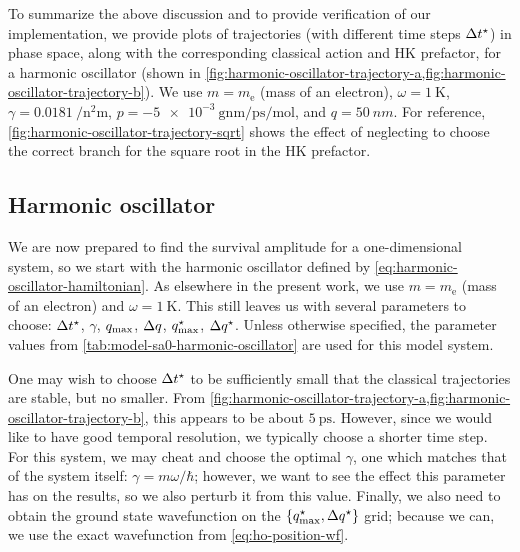 To summarize the above discussion and to provide verification of our implementation, we provide plots of trajectories (with different time steps $\Delta t^\star$) in phase space, along with the corresponding classical action and HK prefactor, for a harmonic oscillator (shown in \cref{fig:harmonic-oscillator-trajectory-a,fig:harmonic-oscillator-trajectory-b}).
We use $m = m_\mathrm{e}$ (mass of an electron), $\omega = \SI{1}{\kelvin}$, $\gamma = \SI{0.0181}{\per\square\nano\meter}$, $p = \SI{-5e-3}{\gram\nano\meter\per\pico\second\per\mole}$, and $q = \SI{50}{nm}$.
For reference, \cref{fig:harmonic-oscillator-trajectory-sqrt} shows the effect of neglecting to choose the correct branch for the square root in the HK prefactor.


\subsection{Harmonic oscillator}

\label{sec:semiclassical-numerical-ho}

We are now prepared to find the survival amplitude for a one-dimensional system, so we start with the harmonic oscillator defined by \vref{eq:harmonic-oscillator-hamiltonian}.
As elsewhere in the present work, we use $m = m_\mathrm{e}$ (mass of an electron) and $\omega = \SI{1}{\kelvin}$.
This still leaves us with several parameters to choose: $\Delta t^\star$, $\gamma$, $q_\mathrm{max}$, $\Delta q$, $q_\mathrm{max}^\star$, $\Delta q^\star$.
Unless otherwise specified, the parameter values from \cref{tab:model-sa0-harmonic-oscillator} are used for this model system.

One may wish to choose $\Delta t^\star$ to be sufficiently small that the classical trajectories are stable, but no smaller.
From \cref{fig:harmonic-oscillator-trajectory-a,fig:harmonic-oscillator-trajectory-b}, this appears to be about $\SI{5}{\pico\second}$.
However, since we would like to have good temporal resolution, we typically choose a shorter time step.
For this system, we may cheat and choose the optimal $\gamma$, one which matches that of the system itself: $\gamma = m \omega / \hbar$; however, we want to see the effect this parameter has on the results, so we also perturb it from this value.
Finally, we also need to obtain the ground state wavefunction on the $\{ q_\mathrm{max}^\star, \Delta q^\star \}$ grid; because we can, we use the exact wavefunction from \vref{eq:ho-position-wf}.


